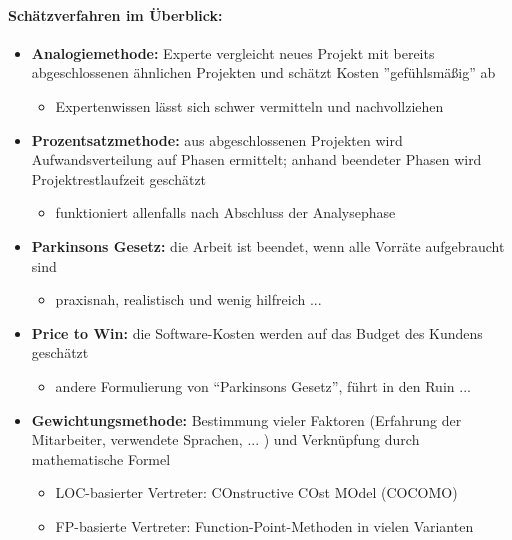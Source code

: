 \paragraph{Schätzverfahren im Überblick:}
\begin{itemize}
	\item \textbf{Analogiemethode:} Experte vergleicht neues Projekt mit bereits abgeschlossenen ähnlichen Projekten und schätzt Kosten ''gefühlsmäßig'' ab
	\begin{itemize}
		\item Expertenwissen lässt sich schwer vermitteln und nachvollziehen
	\end{itemize}
	\item \textbf{Prozentsatzmethode:} aus abgeschlossenen Projekten wird Aufwandsverteilung auf Phasen ermittelt; anhand beendeter Phasen wird Projektrestlaufzeit geschätzt
	\begin{itemize}
		\item funktioniert allenfalls nach Abschluss der Analysephase
	\end{itemize}
	\item \textbf{Parkinsons Gesetz:}  die Arbeit ist beendet, wenn alle Vorräte aufgebraucht sind
	\begin{itemize}
		\item praxisnah, realistisch und wenig hilfreich ...
	\end{itemize}
	\item \textbf{Price to Win:} die Software-Kosten werden auf das Budget des Kundens geschätzt
	\begin{itemize}
		\item andere Formulierung von ``Parkinsons Gesetz'', führt in den Ruin ...
	\end{itemize}
	\item \textbf{Gewichtungsmethode:}  Bestimmung vieler Faktoren (Erfahrung der Mitarbeiter, verwendete Sprachen, ... ) und Verknüpfung durch mathematische Formel
	\begin{itemize}
		\item LOC-basierter Vertreter: COnstructive COst MOdel (COCOMO)
		\item FP-basierte Vertreter: Function-Point-Methoden in vielen Varianten
	\end{itemize}
\end{itemize}

